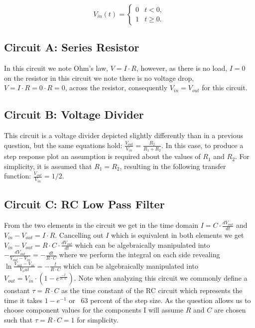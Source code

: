 \documentclass[main.tex]{subfiles}
\begin{document}
\[
    V_{in}(t) =
    \begin{cases} 
        0 & t < 0, \\
        1 & t \geq 0.
    \end{cases}
\]

\subsection{Circuit A: Series Resistor}
In this circuit we note Ohm's law, $V = I \cdot R$, however, as there is no load, $I=0$ on the resistor in this circuit we note there is no voltage drop, $V=I \cdot R=0 \cdot R=0$, across the resistor, consequently $V_{in} = V_{out}$ for this circuit. 


\subsection{Circuit B: Voltage Divider}
This circuit is a voltage divider depicted slightly differently than in a previous question, but the same equations hold: $\frac{V_{out}}{V_{in}} = \frac{R_2}{R_1 + R_2}$. In this case, to produce a step response plot an assumption is required about the values of $R_1$ and $R_2$. For simplicity, it is assumed that $R_1 = R_2$, resulting in the following transfer function: $\frac{V_{out}}{V_{in}} = 1/2$.


\subsection{Circuit C: RC Low Pass Filter}
From the two elements in the circuit we get in the time domain $I = C \cdot \frac{dV_{out}}{dt}$ and $V_{in} - V_{out} = I \cdot R$. Cancelling out $I$ which is equivalent in both elements we get $V_{in} - V_{out} = R \cdot C \cdot \frac{dV_{out}}{dt}$ which can be algebraically manipulated into $-\frac{dV_{out}}{V_{out}-V_{in}} = -\frac{dt}{R \cdot C}$ where we perform the integral on each side revealing $\ln{\frac{V_{out}-V_{in}}{V_out}}=-\frac{t}{R \cdot C}$ which can be algebraically manipulated into $V_{out}=V_{in} \cdot (1-e^{\frac{-t}{R \cdot C}})$. Note when analyzing this circuit we commonly define a constant $\tau = R \cdot C$ as the time constant of the RC circuit which represents the time it takes $1-e^{-1}$ or ~63 percent of the step size. As the question allows us to choose component values for the components I will assume $R$ and $C$ are chosen such that $\tau = R \cdot C = 1$ for simplicity.
\end{document}
